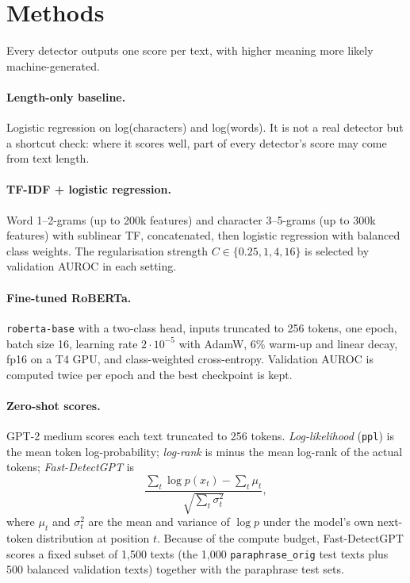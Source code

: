 \documentclass{nle}
\begin{document}
\section{Methods}\label{sec:methods}

Every detector outputs one score per text, with higher meaning more likely machine-generated.

\paragraph{Length-only baseline.} Logistic regression on log(characters) and log(words). It is not a real detector
but a shortcut check: where it scores well, part of every detector's score may come from text length.

\paragraph{TF-IDF + logistic regression.} Word 1--2-grams (up to 200k features) and character 3--5-grams (up to 300k
features) with sublinear TF, concatenated, then logistic regression with balanced class weights. The regularisation
strength $C \in \{0.25, 1, 4, 16\}$ is selected by validation AUROC in each setting.

\paragraph{Fine-tuned RoBERTa.} \texttt{roberta-base} with a two-class head, inputs truncated to 256 tokens, one epoch,
batch size 16, learning rate $2\cdot10^{-5}$ with AdamW, 6\% warm-up and linear decay, fp16 on a T4 GPU, and
class-weighted cross-entropy. Validation AUROC is computed twice per epoch and the best checkpoint is kept.

\paragraph{Zero-shot scores.} GPT-2 medium scores each text truncated to 256 tokens.
\emph{Log-likelihood} (\texttt{ppl}) is the mean token log-probability; \emph{log-rank} is minus the mean log-rank of
the actual tokens; \emph{Fast-DetectGPT} \cite{bao24} is
\[
  \frac{\sum_t \log p(x_t) - \sum_t \mu_t}{\sqrt{\sum_t \sigma_t^2}},
\]
where $\mu_t$ and $\sigma_t^2$ are the mean and variance of $\log p$ under the model's own next-token distribution at
position $t$. Because of the compute budget, Fast-DetectGPT scores a fixed subset of 1,500 texts (the 1,000
\texttt{paraphrase\_orig} test texts plus 500 balanced validation texts) together with the paraphrase test sets.
\end{document}

